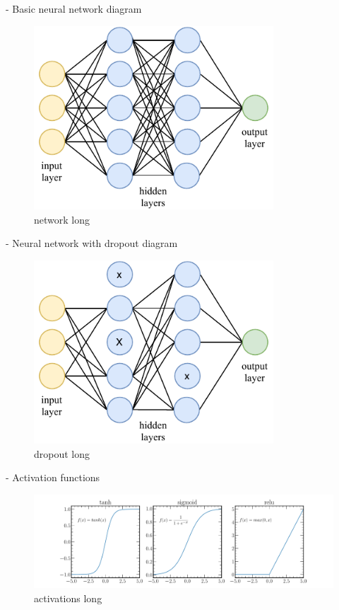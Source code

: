 - Basic neural network diagram
\begin{figure}
    \includegraphics[width=0.8\textwidth]{diagrams/6-cvn/network.pdf}
    \caption[network short]{network long}
    \label{fig:network}
\end{figure}
- Neural network with dropout diagram
\begin{figure}
    \includegraphics[width=0.8\textwidth]{diagrams/6-cvn/dropout.pdf}
    \caption[dropout short]{dropout long}
    \label{fig:dropout}
\end{figure}
- Activation functions
\begin{figure}
    \includegraphics[width=\textwidth]{diagrams/6-cvn/activations.pdf}
    \caption[activations short]{activations long}
    \label{fig:activations}
\end{figure}
